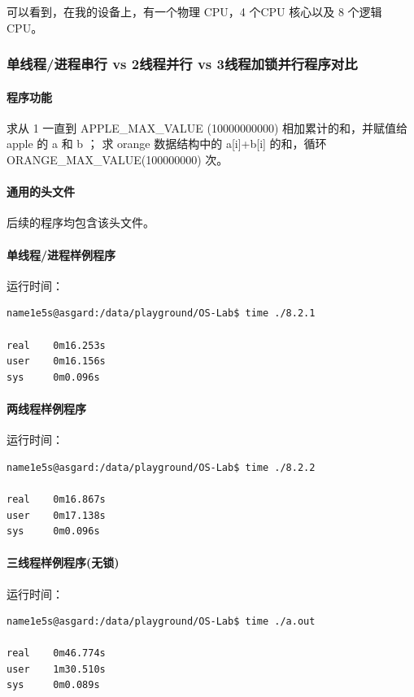 \documentclass[blue,normal,cn]{elegantnote}
\begin{document}
可以看到，在我的设备上，有一个物理 CPU，4 个CPU 核心以及 8 个逻辑 CPU。
\subsubsection{单线程/进程串行 vs 2线程并行 vs 3线程加锁并行程序对比}
\paragraph{程序功能}
求从 1 一直到 APPLE\_MAX\_VALUE (10000000000) 
相加累计的和，并赋值给 apple 的 a 和 b ；
求 orange 数据结构中的 a[i]+b[i] 的和，循环 
ORANGE\_MAX\_VALUE(100000000) 次。

\paragraph{通用的头文件}
后续的程序均包含该头文件。


\paragraph{单线程/进程样例程序}

运行时间：
\begin{lstlisting}
name1e5s@asgard:/data/playground/OS-Lab$ time ./8.2.1 

real    0m16.253s
user    0m16.156s
sys     0m0.096s
\end{lstlisting}

\paragraph{两线程样例程序}

运行时间：
\begin{lstlisting}
name1e5s@asgard:/data/playground/OS-Lab$ time ./8.2.2 

real    0m16.867s
user    0m17.138s
sys     0m0.096s
\end{lstlisting}

\paragraph{三线程样例程序(无锁)}

运行时间：
\begin{lstlisting}
name1e5s@asgard:/data/playground/OS-Lab$ time ./a.out 

real    0m46.774s
user    1m30.510s
sys     0m0.089s
\end{lstlisting}
\end{document}
